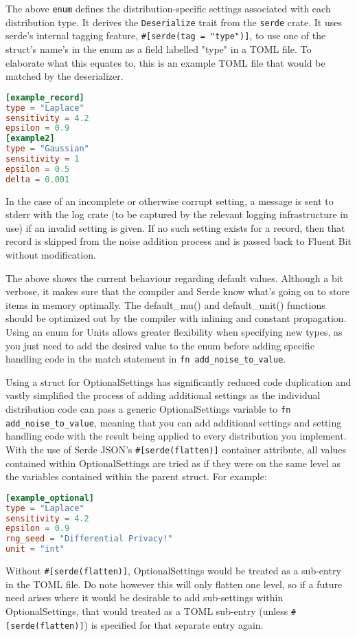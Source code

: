The above \texttt{enum} defines the distribution-specific settings associated with each distribution type. It derives the \texttt{Deserialize} trait from the \texttt{serde} crate. It uses serde's internal tagging feature, \texttt{\#[serde(tag = "type")]}, to use one of the struct's name's in the enum as a field labelled "type" in a TOML file. To elaborate what this equates to, this is an example TOML file that would be matched by the deserializer.
\begin{lstlisting}[language=toml, caption={Example privacy settings}]
[example_record]
type = "Laplace"
sensitivity = 4.2
epsilon = 0.9
[example2]
type = "Gaussian"
sensitivity = 1
epsilon = 0.5
delta = 0.001
\end{lstlisting}
In the case of an incomplete or otherwise corrupt setting, a message is sent to stderr with the log crate (to be captured by the relevant logging infrastructure in use) if an invalid setting is given. If no such setting exists for a record, then that record is skipped from the noise addition process and is passed back to Fluent Bit without modification. 



The above shows the current behaviour regarding default values. Although a bit verbose, it makes sure that the compiler and Serde know what's going on to store items in memory optimally. The default\_mu() and default\_unit() functions should be optimized out by the compiler with inlining and constant propagation. Using an enum for Units allows greater flexibility when specifying new types, as you just need to add the desired value to the enum before adding specific handling code in the match statement in \texttt{fn add\_noise\_to\_value}.

Using a struct for OptionalSettings has significantly reduced code duplication and vastly simplified the process of adding additional settings as the individual distribution code can pass a generic OptionalSettings variable to \texttt{fn add\_noise\_to\_value}, meaning that you can add additional settings and setting handling code with the result being applied to every distribution you implement. With the use of Serde JSON's \texttt{\#[serde(flatten)]} container attribute, all values contained within OptionalSettings are tried as if they were on the same level as the variables contained within the parent struct. For example:

\begin{lstlisting}[language=TOML, caption={Example privacy setting with fixed RNG seed}]
[example_optional]
type = "Laplace"
sensitivity = 4.2
epsilon = 0.9
rng_seed = "Differential Privacy!"
unit = "int"
\end{lstlisting}
Without \texttt{\#[serde(flatten)]}, OptionalSettings would be treated as a sub-entry in the TOML file. Do note however this will only flatten one level, so if a future need arises where it would be desirable to add sub-settings within OptionalSettings, that would treated as a TOML sub-entry (unless \texttt{\#[serde(flatten)]}) is specified for that separate entry again.

